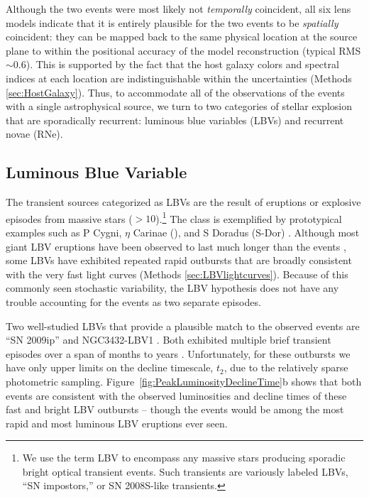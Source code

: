 
Although the two events were most likely not {\it temporally}
coincident, all six lens models indicate that it is entirely plausible
for the two \spock events to be {\it spatially} coincident: they can
be mapped back to the same physical location at the source plane to
within the positional accuracy of the model reconstruction (typical
RMS$\sim$0.6\arcsec). This is supported by the fact that the host
galaxy colors and spectral indices at each \spock location are
indistinguishable within the uncertainties (Methods
\ref{sec:HostGalaxy}).  Thus, to accommodate all of the observations
of the \spock events with a single astrophysical source, we turn to
two categories of stellar explosion that are sporadically recurrent:
luminous blue variables (LBVs) and recurrent novae (RNe).

\subsection{Luminous Blue Variable}

The transient sources categorized as LBVs are the result of eruptions
or explosive episodes from massive stars ($>10$\Msun).\footnote{We use
  the term LBV to encompass any massive stars producing sporadic
  bright optical transient events. Such
  transients are variously labeled LBVs, ``SN impostors,'' or SN
  2008S-like transients.}   The class is
exemplified by prototypical examples such as P Cygni, $\eta$ Carinae
(\etacar), and S Doradus (S-Dor) \citep[for recent overviews of the
  LBV class, see][]{Smith:2011b, Kochanek:2012}.  Although most giant
LBV eruptions have been observed to last much longer than the \spock
events \citep{Smith:2011b}, some LBVs have exhibited repeated rapid
outbursts that are broadly consistent with the very fast \spock light
curves (Methods \ref{sec:LBVlightcurves}). Because of this commonly
seen stochastic variability, the LBV hypothesis does not have any
trouble accounting for the \spock events as two separate episodes.

Two well-studied LBVs that provide a plausible match to the observed
\spock events are ``SN 2009ip'' \citep{Maza:2009} and NGC3432-LBV1
\citep{Pastorello:2010}.  Both exhibited multiple brief transient
episodes over a span of months to years \citep[e.g.,][]{Miller:2009,
  Li:2009, Berger:2009, Drake:2010, Pastorello:2010}.  Unfortunately,
for these outbursts we have only upper limits on the decline
timescale, $t_2$, due to the relatively sparse photometric sampling.
Figure~\ref{fig:PeakLuminosityDeclineTime}b shows that both \spock
events are consistent with the observed luminosities and decline times
of these fast and bright LBV outbursts -- though the \spock events
would be among the most rapid and most luminous LBV eruptions ever
seen.

